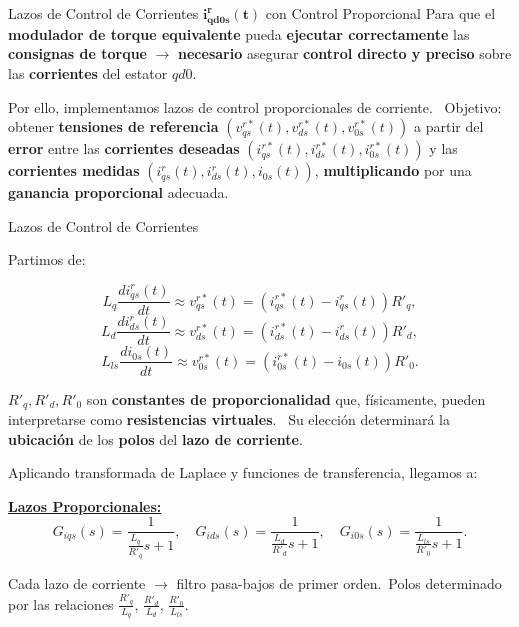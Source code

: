\documentclass[12pt]{beamer}
\begin{document}
\begin{frame}{\small Lazos de Control de Corrientes \(\boldsymbol{i^r_{q d 0 s}(t)}\) con Control Proporcional} \small
Para que el \textbf{modulador de torque equivalente} pueda \textbf{ejecutar correctamente} las \textbf{consignas de torque} $\rightarrow$ \textbf{necesario} asegurar \textbf{control directo y preciso} sobre las \textbf{corrientes} del estator \( qd0 \).

\vspace{0.5cm} %

Por ello, implementamos lazos de control proporcionales de corriente. \
Objetivo: obtener \textbf{tensiones de referencia} \((v_{qs}^{r*}(t), v_{ds}^{r*}(t), v_{0s}^{r*}(t))\) a partir del \textbf{error} entre las \textbf{corrientes deseadas} \((i_{qs}^{r*}(t), i_{ds}^{r*}(t), i_{0s}^{r*}(t))\) y las \textbf{corrientes medidas} \((i_{qs}^r(t), i_{ds}^r(t), i_{0s}(t))\), \textbf{multiplicando} por una \textbf{ganancia proporcional} adecuada.

\end{frame}
\begin{frame}{Lazos de Control de Corrientes} \footnotesize

Partimos de:

\[
L_q \frac{d i_{qs}^r(t)}{dt} \approx v_{qs}^{r*}(t) = (i_{qs}^{r*}(t) - i_{qs}^r(t)) R'_q,
\]
\[
L_d \frac{d i_{ds}^r(t)}{dt} \approx v_{ds}^{r*}(t) = (i_{ds}^{r*}(t) - i_{ds}^r(t)) R'_d,
\]
\[
L_{ls} \frac{d i_{0s}(t)}{dt} \approx v_{0s}^{r*}(t) = (i_{0s}^{r*}(t) - i_{0s}(t)) R'_0.
\]

\(R'_q, R'_d, R'_0\) son \textbf{constantes de proporcionalidad} que, físicamente, pueden interpretarse como \textbf{resistencias virtuales}. \ 
Su elección determinará la \textbf{ubicación} de los \textbf{polos} del \textbf{lazo de corriente}.

\vspace{0.1cm} %

Aplicando transformada de Laplace y funciones de transferencia, llegamos a:

\textbf{\underline{Lazos Proporcionales:}}
\[
G_{iqs}(s) = \frac{1}{\frac{L_q}{R'_q}s + 1}, \quad
G_{ids}(s) = \frac{1}{\frac{L_d}{R'_d}s + 1}, \quad
G_{i0s}(s) = \frac{1}{\frac{L_{ls}}{R'_0} s + 1}.
\]

Cada lazo de corriente $\rightarrow$ filtro pasa-bajos de primer orden.\
Polos determinado por las relaciones \(\frac{R'_q}{L_q}\), \(\frac{R'_d}{L_d}\), \(\frac{R'_0}{L_{ls}}\).

\end{frame}
\end{document}
